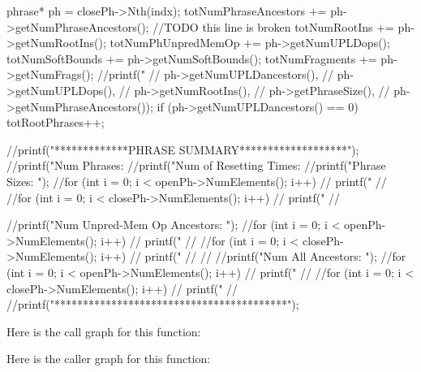 \begin{DoxyCode}
                                      {
        phrase* ph = closePh->Nth(indx);
        totNumPhraseAncestors += ph->getNumPhraseAncestors(); //TODO this line is
       broken
        totNumRootIns         += ph->getNumRootIns();
        totNumPhUnpredMemOp   += ph->getNumUPLDops();
        totNumSoftBounds      += ph->getNumSoftBounds();
        totNumFragments       += ph->getNumFrags();
        //printf("%
        //                                       ph->getNumUPLDancestors(), 
        //                                       ph->getNumUPLDops(), 
        //                                       ph->getNumRootIns(),
        //                                       ph->getPhraseSize(),
        //                                       ph->getNumPhraseAncestors());
        if (ph->getNumUPLDancestors() == 0) totRootPhrases++;

        //printf("*************PHRASE SUMMARY*******************\n");
        //printf("Num Phrases: %
        //printf("Num of Resetting Times: %
        //printf("Phrase Sizes: \n");
        //for (int i = 0; i < openPh->NumElements(); i++) {
        //      printf("%
        //}
        //for (int i = 0; i < closePh->NumElements(); i++) {
        //      printf("%
        //}

        //printf("\nPhrase Num Unpred-Mem Op Ancestors: \n");
        //for (int i = 0; i < openPh->NumElements(); i++) {
        //      printf("%
        //}
        //for (int i = 0; i < closePh->NumElements(); i++) {
        //      printf("%
        //}
        //
        //printf("\nPhrase Num All Ancestors: \n");
        //for (int i = 0; i < openPh->NumElements(); i++) {
        //      printf("%
        //}
        //for (int i = 0; i < closePh->NumElements(); i++) {
        //      printf("%
        //}
        //printf("\n******************************************\n");
}
\end{DoxyCode}


Here is the call graph for this function:




Here is the caller graph for this function:


